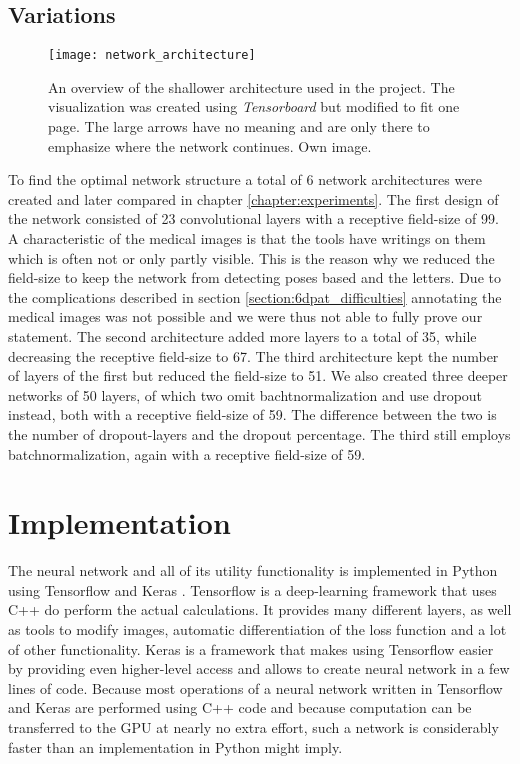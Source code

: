 \subsection{Variations} \label{section:network_variations}

\begin{figure}[!tbp]
	\centering
    \texttt{[image: network\_architecture]}
    \caption{An overview of the shallower architecture used in the project. The visualization was created using \textit{Tensorboard} but modified to fit one page. The large arrows have no meaning and are only there to emphasize where the network continues. Own image.}
    	\label{fig:network_architecture}
\end{figure}

To find the optimal network structure a total of 6 network architectures were created and later compared in chapter \ref{chapter:experiments}. The first design of the network consisted of 23 convolutional layers with a receptive field-size of 99. A characteristic of the medical images is that the tools have writings on them which is often not or only partly visible. This is the reason why we reduced the field-size to keep the network from detecting poses based and the letters. Due to the complications described in section \ref{section:6dpat_difficulties} annotating the medical images was not possible and we were thus not able to fully prove our statement. The second architecture added more layers to a total of 35, while decreasing the receptive field-size to 67. The third architecture kept the number of layers of the first but reduced the field-size to 51. We also created three deeper networks of 50 layers, of which two omit bachtnormalization and use dropout instead, both with a receptive field-size of 59. The difference between the two is the number of dropout-layers and the dropout percentage. The third still employs batchnormalization, again with a receptive field-size of 59.

\section{Implementation}

The neural network and all of its utility functionality is implemented in Python using Tensorflow \cite{tensorflow} and Keras \cite{keras}. Tensorflow is a deep-learning framework that uses C++ do perform the actual calculations. It provides many different layers, as well as tools to modify images, automatic differentiation of the loss function and a lot of other functionality. Keras is a framework that makes using Tensorflow easier by providing even higher-level access and allows to create neural network in a few lines of code. Because most operations of a neural network written in Tensorflow and Keras are performed using C++ code and because computation can be transferred to the GPU at nearly no extra effort, such a network is considerably faster than an implementation in Python might imply.

